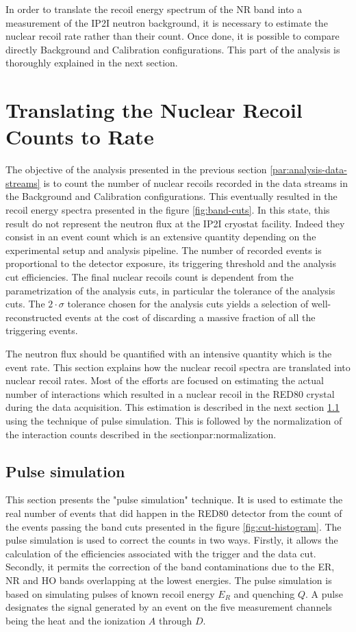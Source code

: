 In order to translate the recoil energy spectrum of the NR band into a measurement of the IP2I neutron background, it is necessary to estimate the nuclear recoil rate rather than their count. Once done, it is possible to compare directly Background and Calibration configurations. This part of the analysis is thoroughly explained in the next section.


\section{Translating the Nuclear Recoil Counts to Rate}

The objective of the analysis presented in the previous section \ref{par:analysis-data-streams} is to count the number of nuclear recoils recorded in the data streams in the Background and Calibration configurations. This eventually resulted in the recoil energy spectra presented in the figure \ref{fig:band-cuts}. In this state, this result do not represent the neutron flux at the IP2I cryostat facility. 
Indeed they consist in an event count which is an extensive quantity depending on the experimental setup and analysis pipeline. The number of recorded events is proportional to the detector exposure, its triggering threshold and the analysis cut efficiencies. The final nuclear recoils count is dependent from the parametrization of the analysis cuts, in particular the tolerance of the analysis cuts. The $2 \cdot \sigma$ tolerance chosen for the analysis cuts yields a selection of well-reconstructed events at the cost of discarding a massive fraction of all the triggering events. 

The neutron flux should be quantified with an intensive quantity which is the event rate. This section explains how the nuclear recoil spectra are translated into nuclear recoil rates. 
Most of the efforts are focused on estimating the actual number of interactions which resulted in a nuclear recoil in the RED80 crystal during the data acquisition. This estimation is described in the next section \ref{par:pulse-simulation} using the technique of pulse simulation.
This is followed by the normalization of the interaction counts described in the section{par:normalization}.


\subsection{Pulse simulation}
\label{par:pulse-simulation}

This section presents the "pulse simulation" technique. It is used to estimate the real number of events that did happen in the RED80 detector from the count of the events passing the band cuts presented in the figure \ref{fig:cut-histogram}. The pulse simulation is used to correct the counts in two ways. 
Firstly, it allows the calculation of the efficiencies associated with the trigger and the data cut. Secondly, it permits the correction of the band contaminations due to the ER, NR and HO bands overlapping at the lowest energies.
The pulse simulation is based on simulating pulses of known recoil energy $E_R$ and quenching $Q$. A pulse designates the signal generated by an event on the five measurement channels being the heat and the ionization $A$ through $D$.


